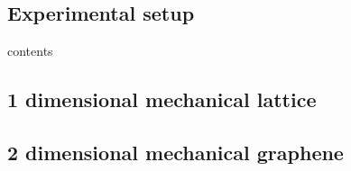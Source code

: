 \documentclass[../main.tex]{subfiles}
\begin{document}
\subsection{Experimental setup}

contents

\subsection{1 dimensional mechanical lattice}

\subsection{2 dimensional mechanical graphene}
\end{document}
